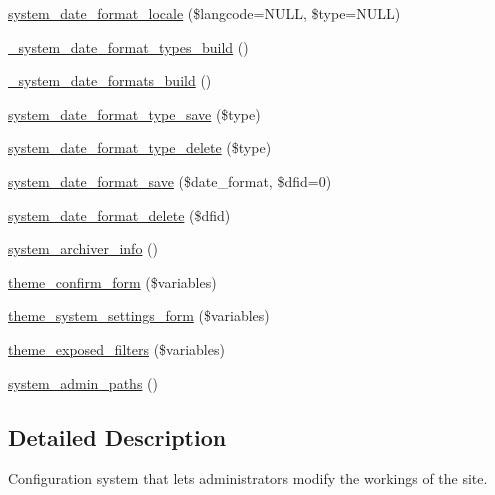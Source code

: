 \begin{DoxyCompactItemize}
\item 
\hyperlink{system_8module_a27ec4ab4ca19ea7d22db475691d1eea5}{system\_\-date\_\-format\_\-locale} (\$langcode=NULL, \$type=NULL)
\item 
\hyperlink{system_8module_aed8872b51fe912cbf8d4e966af237b66}{\_\-system\_\-date\_\-format\_\-types\_\-build} ()
\item 
\hyperlink{system_8module_a029d9166154fd78b3618b2e357ea3710}{\_\-system\_\-date\_\-formats\_\-build} ()
\item 
\hyperlink{system_8module_a88de386e3357b4531e37f56c26c20a9c}{system\_\-date\_\-format\_\-type\_\-save} (\$type)
\item 
\hyperlink{system_8module_ac495d113f7fcd34fe1cee36c6a2d51b9}{system\_\-date\_\-format\_\-type\_\-delete} (\$type)
\item 
\hyperlink{system_8module_a08b578d5998a5c83ece092e2fcbeb22f}{system\_\-date\_\-format\_\-save} (\$date\_\-format, \$dfid=0)
\item 
\hyperlink{system_8module_ad5772362b4f49cec71d9572c6f02ebfd}{system\_\-date\_\-format\_\-delete} (\$dfid)
\item 
\hyperlink{system_8module_a39d36c996e2c4ce278f4adaee74ea96c}{system\_\-archiver\_\-info} ()
\item 
\hyperlink{group__themeable_ga21630d5749786400d03449b295f9a31d}{theme\_\-confirm\_\-form} (\$variables)
\item 
\hyperlink{group__themeable_ga61657b80e20cf36542ce65894984df79}{theme\_\-system\_\-settings\_\-form} (\$variables)
\item 
\hyperlink{group__themeable_ga8750c0043fa9aecbe88594d8b018fa3c}{theme\_\-exposed\_\-filters} (\$variables)
\item 
\hyperlink{system_8module_a541e64401df167df2dc2b0964f90d9ce}{system\_\-admin\_\-paths} ()
\end{DoxyCompactItemize}


\subsection{Detailed Description}
Configuration system that lets administrators modify the workings of the site. 

